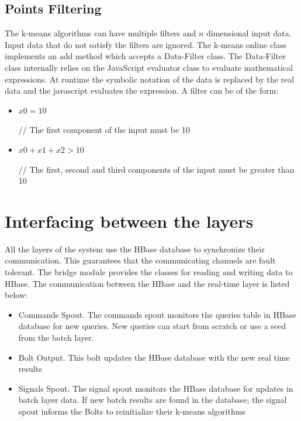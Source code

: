 \documentclass{lmproj}
\begin{document}
\subsection{Points Filtering}

The k-means algorithms can have multiple filters and $n$ dimensional input data. Input data that do not satisfy the filters are ignored. The k-means online class implements an add method which accepts a Data-Filter class. The Data-Filter class internally relies on the JavaScript evaluator class to evaluate mathematical expressions. At runtime the symbolic notation of the data is replaced by the real data and the javascript evaluates the expression. A filter can be of the form:

 \begin{itemize}
 	\item
 	\begin{minipage}[t]{0.3\linewidth}
 		$x0 = 10$
 	\end{minipage}%
 	\begin{minipage}{.7\linewidth}
		// The first component of the input must be 10
 	\end{minipage}
 
 
 	\item
 	\begin{minipage}[t]{0.3\linewidth}
	 	$x0 + x1 + x2 > 10$
 	\end{minipage}%
 	\begin{minipage}{.7\linewidth}
 		// The first, second and third components of the input must be greater than 10
 	\end{minipage}
 \end{itemize}


\section{Interfacing between the layers}

All the layers of the system use the HBase database to synchronize their communication. This guarantees that the communicating channels are fault tolerant. The bridge module provides the classes for reading and writing data to HBase. The communication between the HBase and the real-time layer is listed below:

\begin{itemize}
	\item Commands Spout. The commands spout monitors the queries table in HBase database for new queries.  New queries can start from scratch or use a seed from the batch layer. 
	\item Bolt Output. This bolt updates the HBase database with the new real time results
	\item Signals Spout. The signal spout monitors the HBase database for updates in batch layer data. If new batch results are found in the database, the signal spout informs the Bolts to reinitialize their k-means algorithms 
\end{itemize}
\end{document}
